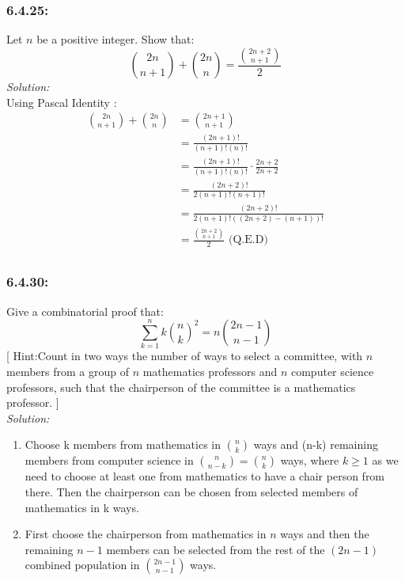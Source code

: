 \documentclass[a4paper]{article}
\begin{document}
	\subsubsection*{6.4.25:} Let $n$ be a positive integer. Show that: 
	\begin{equation*}
	    {{2n} \choose {n+1}} + {{2n} \choose {n}} = \frac{{{2n+2} \choose {n+1}}}{2}
	\end{equation*}
	\textit{Solution:} \\
	Using Pascal Identity :
	\begin{align*}
	   {{2n} \choose {n+1}} + {{2n} \choose {n}} &= {{2n+1} \choose {n+1}} \\
	   &= \frac{(2n+1)!}{(n+1)!(n)!} \\
	   &= \frac{(2n+1)!}{(n+1)!(n)!} \cdot \frac{2n+2}{2n+2} \\
	   &= \frac{(2n+2)!}{2(n+1)!(n+1)!} \\
	   &= \frac{(2n+2)!}{2(n+1)!((2n+2)-(n+1))!} \\
	   &= \frac{{{2n+2} \choose {n+1}}}{2} \text{ (Q.E.D)} \\
	\end{align*} 
	
	\subsubsection*{6.4.30:}
	Give a combinatorial proof that:
	\begin{equation*}
	    \sum_{k=1}^{n} k{n \choose k}^{2} = n{{2n-1}\choose{n-1}}
	\end{equation*}
	[ Hint:Count in two ways the number of ways to select a committee, with $n$ members from a group of $n$ mathematics professors and $n$ computer science professors, such that the chairperson of the committee is a mathematics professor. ]\\
	\textit{Solution:} \\
	\begin{enumerate}
	    \item Choose k members from mathematics in ${n \choose k}$ ways and (n-k) remaining members from computer science in ${n\choose{n-k}} = {n \choose k}$ ways, where $k \geq 1$ as we need to choose at least one from mathematics to have a chair person from there. Then the chairperson can be chosen from selected members of mathematics in k ways.
	    \item First choose the chairperson from mathematics in $n$ ways and then the remaining $n-1$ members can be selected from the rest of the $(2n -1)$ combined population in ${{2n-1}\choose{n-1}}$ ways.
	\end{enumerate}
	\newpage
\end{document}
